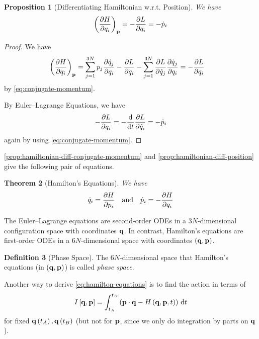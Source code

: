 \documentclass[11pt]{article}
\numberwithin{equation}{section}
\newtheorem{theorem}{Theorem}[section]
\newtheorem{proposition}[theorem]{Proposition}
\theoremstyle{definition}
\newtheorem{definition}[theorem]{Definition}
\theoremstyle{remark}
\newcommand{\pqty}[1]{\left(#1\right)}
\newcommand{\bqty}[1]{\left[#1\right]}
\newcommand{\vdot}{\cdot}
\newcommand{\qand}{\quad\text{and}\quad}
\begin{document}
\begin{proposition}[Differentiating Hamiltonian w.r.t. Position]\label{variation-unit-0069}
    \label{prop:hamiltonian-diff-position}%
    We have
    \[
        \pqty{\pdv{H}{q_i}}_{\vb{p}} = - \pdv{L}{q_i} = - \dot{p}_i
    \]
\end{proposition}

\begin{proof}
    We have
    \begin{align*}
        \pqty{\pdv{H}{q_i}}_{\vb{p}} &= \sum_{j = 1}^{3N} p_j \pdv{\dot{q}_j}{q_i} - \pdv{L}{q_i} - \sum_{j = 1}^{3N} \pdv{L}{\dot{q}_j} \pdv{\dot{q}_j}{q_i} = - \pdv{L}{q_i}
    \end{align*}
    by \autoref{eq:conjugate-momentum}.

    By Euler--Lagrange Equations, we have
    \[
        - \pdv{L}{q_i} = - \dv{t} \pdv{L}{\dot{q}_i} = - \dot{p}_i
    \]
    again by using \autoref{eq:conjugate-momentum}.
\end{proof}

\autoref{prop:hamiltonian-diff-conjugate-momentum} and \autoref{prop:hamiltonian-diff-position} give the following pair of equations.

\begin{theorem}[Hamilton's Equations]\label{variation-unit-0070}
    We have
    \begin{equation}
        \label{eq:hamilton-equations}
        \dot{q}_i = \pdv{H}{p_i} \qand \dot{p}_i = - \pdv{H}{q_i}
    \end{equation}
\end{theorem}

The Euler--Lagrange equations are second-order ODEs in a \(3N\)-dimensional configuration space with coordinates \(\vb{q}\). In contrast, Hamilton's equations are first-order ODEs in a \(6N\)-dimensional space with coordinates \(\pqty{\vb{q}, \vb{p}}\).

\begin{definition}[Phase Space]\label{variation-unit-0071}
    The \(6N\)-dimensional space that Hamilton's equations (in \(\pqty{\vb{q}, \vb{p}}\)) is called \emph{phase space}.
\end{definition}

Another way to derive \autoref{eq:hamilton-equations} is to find the action in terms of
\[
    I\bqty{\vb{q}, \vb{p}} = \int_{t_A}^{t_B} \pqty{\vb{p} \vdot \dot{\vb{q}} - H \pqty{\vb{q}, \vb{p}, t}} \dd{t}
\]
for fixed \(\vb{q} \pqty{t_A}, \vb{q} \pqty{t_B}\) (but not for \(\vb{p}\), since we only do integration by parts on \(\vb{q}\)).
\end{document}
